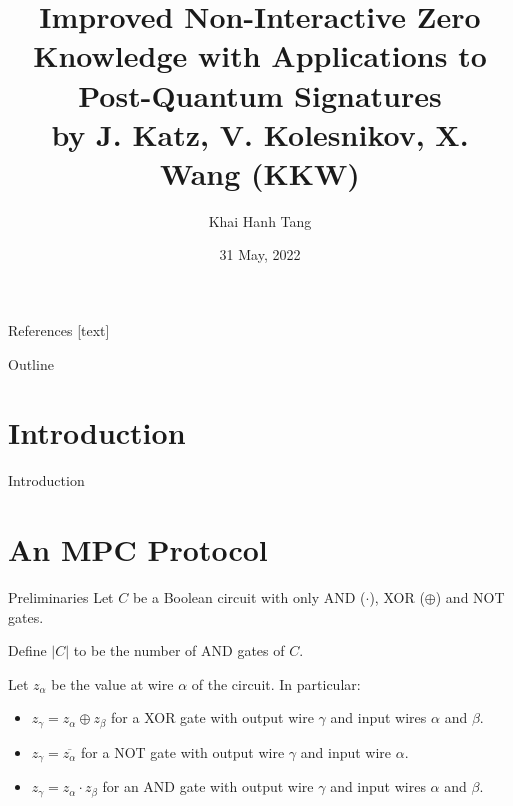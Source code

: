 \documentclass{beamer}
\title{Improved Non-Interactive Zero Knowledge with Applications to Post-Quantum Signatures\\ by  J. Katz, V. Kolesnikov, X. Wang (KKW)}
\author{Khai Hanh Tang}
\date{31 May, 2022}
\begin{document}
	
	\begin{frame}
		\titlepage
	\end{frame}
	
	\begin{frame}{References}
		
		
		
	\end{frame}
	
	\begin{frame}{Outline}
		\tableofcontents
		
	\end{frame}
	
	\section{Introduction}
	\begin{frame}{Introduction}
		
	\end{frame}
	
	\section{An MPC Protocol}
	\begin{frame}{Preliminaries}
		Let $C$ be a Boolean circuit with only AND ($\cdot$), XOR ($\oplus$) and NOT gates. 
		
		Define $\vert C \vert$ to be the number of AND gates of $C$.
		
		Let $z_\alpha$ be the value at wire $\alpha$ of the circuit. In particular:
		\begin{itemize}
			\item $z_\gamma = z_\alpha \oplus z_\beta$ for a XOR gate with output wire $\gamma$ and input wires $\alpha$ and $\beta$.
			\item $z_\gamma = \overline{z_\alpha}$ for a NOT gate with output wire $\gamma$ and input wire $\alpha$.
			\item $z_\gamma = z_\alpha \cdot z_\beta$ for an AND gate with output wire $\gamma$ and input wires $\alpha$ and $\beta$.
		\end{itemize}
	\end{frame}
\end{document}
